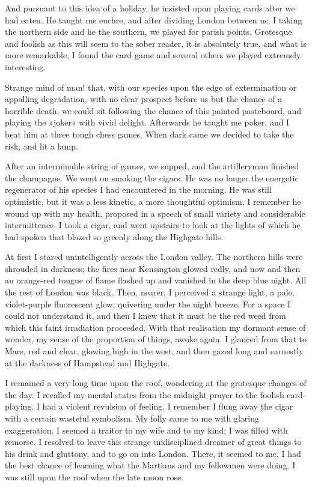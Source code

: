 And pursuant to this idea of a holiday, he insisted upon playing cards after we had eaten. He taught me euchre, and after dividing London between us, I taking the northern side and he the southern, we played for parish points. Grotesque and foolish as this will seem to the sober reader, it is absolutely true, and what is more remarkable, I found the card game and several others we played extremely interesting.



Strange mind of man! that, with our species upon the edge of extermination or appalling degradation, with no clear prospect before us but the chance of a horrible death, we could sit following the chance of this painted pasteboard, and playing the »joker« with vivid delight. Afterwards he taught me poker, and I beat him at three tough chess games. When dark came we decided to take the risk, and lit a lamp.

After an interminable string of games, we supped, and the artilleryman finished the champagne. We went on smoking the cigars. He was no longer the energetic regenerator of his species I had encountered in the morning. He was still optimistic, but it was a less kinetic, a more thoughtful optimism. I remember he wound up with my health, proposed in a speech of small variety and considerable intermittence. I took a cigar, and went upstairs to look at the lights of which he had spoken that blazed so greenly along the Highgate hills.



At first I stared unintelligently across the London valley. The northern hills were shrouded in darkness; the fires near Kensington glowed redly, and now and then an orange-red tongue of flame flashed up and vanished in the deep blue night. All the rest of London was black. Then, nearer, I perceived a strange light, a pale, violet-purple fluorescent glow, quivering under the night breeze. For a space I could not understand it, and then I knew that it must be the red weed from which this faint irradiation proceeded. With that realisation my dormant sense of wonder, my sense of the proportion of things, awoke again. I glanced from that to Mars, red and clear, glowing high in the west, and then gazed long and earnestly at the darkness of Hampstead and Highgate.

I remained a very long time upon the roof, wondering at the grotesque changes of the day. I recalled my mental states from the midnight prayer to the foolish card-playing. I had a violent revulsion of feeling. I remember I flung away the cigar with a certain wasteful symbolism. My folly came to me with glaring exaggeration. I seemed a traitor to my wife and to my kind; I was filled with remorse. I resolved to leave this strange undisciplined dreamer of great things to his drink and gluttony, and to go on into London. There, it seemed to me, I had the best chance of learning what the Martians and my fellowmen were doing. I was still upon the roof when the late moon rose.

